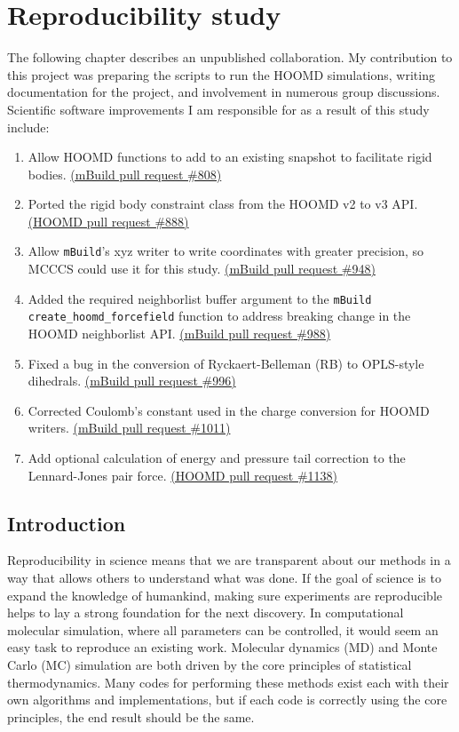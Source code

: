 \chapter{Reproducibility study}
\label{chap:reproducibility}

The following chapter describes an unpublished collaboration.
My contribution to this project was preparing the scripts to run the HOOMD simulations, writing documentation for the project, and involvement in numerous group discussions. 
Scientific software improvements I am responsible for as a result of this study include:
\begin{enumerate}
    \item Allow HOOMD functions to add to an existing snapshot to facilitate rigid bodies. \href{https://github.com/mosdef-hub/mbuild/pull/808}{(mBuild pull request \#808)}
    \item Ported the rigid body constraint class from the HOOMD v2 to v3 API. \href{https://github.com/glotzerlab/hoomd-blue/pull/888}{(HOOMD pull request \#888)}
    \item Allow \texttt{mBuild}'s xyz writer to write coordinates with greater precision, so MCCCS could use it for this study. \href{https://github.com/mosdef-hub/mbuild/pull/996}{(mBuild pull request \#948)}
    \item Added the required neighborlist buffer argument to the \texttt{mBuild} \lstinline{create_hoomd_forcefield} function to address breaking change in the HOOMD neighborlist API. \href{https://github.com/mosdef-hub/mbuild/pull/988}{(mBuild pull request \#988)}
    \item Fixed a bug in the conversion of Ryckaert-Belleman (RB) to OPLS-style dihedrals. \href{https://github.com/mosdef-hub/mbuild/pull/996}{(mBuild pull request \#996)}
    \item Corrected Coulomb's constant used in the charge conversion for HOOMD writers. \href{https://github.com/mosdef-hub/mbuild/pull/1011}{(mBuild pull request \#1011)}
    \item Add optional calculation of energy and pressure tail correction to the Lennard-Jones pair force. \href{https://github.com/glotzerlab/hoomd-blue/pull/1138}{(HOOMD pull request \#1138)}
\end{enumerate}

\section{Introduction}
Reproducibility in science means that we are transparent about our methods in a way that allows others to understand what was done.
If the goal of science is to expand the knowledge of humankind, making sure experiments are reproducible helps to lay a strong foundation for the next discovery.
In computational molecular simulation, where all parameters can be controlled, it would seem an easy task to reproduce an existing work.
Molecular dynamics (MD) and Monte Carlo (MC) simulation are both driven by the core principles of statistical thermodynamics.
Many codes for performing these methods exist each with their own algorithms and implementations, but if each code is correctly using the core principles, the end result should be the same.

